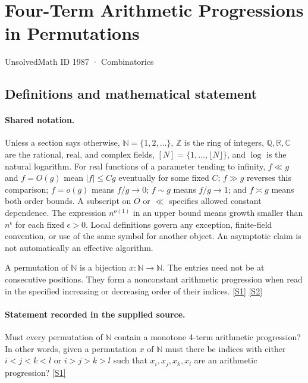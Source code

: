 \documentclass[11pt,a4paper]{article}
\newcommand{\N}{\mathbb{N}}
\newcommand{\Z}{\mathbb{Z}}
\newcommand{\Q}{\mathbb{Q}}
\newcommand{\R}{\mathbb{R}}
\newcommand{\C}{\mathbb{C}}
\newcommand{\sref}[2]{\hyperlink{source:#1:#2}{[S#2]}}
\begin{document}

\setcounter{section}{1986}

\section{Four-Term Arithmetic Progressions in Permutations}\label{1987}

{\small\sffamily UnsolvedMath ID 1987 · Combinatorics}

\subsection{Definitions and mathematical statement}

\paragraph{Shared notation.}Unless a section says otherwise, $\N=\{1,2,\ldots\}$,
$\Z$ is the ring of integers, $\Q,\R,\C$ are the rational, real, and complex
fields, $[N]=\{1,\ldots,\lfloor N\rfloor\}$, and $\log$ is the natural
logarithm. For real functions of a parameter tending to infinity,
$f\ll g$ and $f=O(g)$ mean $|f|\leq Cg$ eventually for some fixed $C$;
$f\gg g$ reverses this comparison; $f=o(g)$ means $f/g\to0$;
$f\sim g$ means $f/g\to1$; and $f\asymp g$ means both order bounds.
A subscript on $O$ or $\ll$ specifies allowed constant dependence.
The expression $n^{o(1)}$ in an upper bound means growth smaller than
$n^\epsilon$ for each fixed $\epsilon>0$. Local definitions govern any
exception, finite-field convention, or use of the same symbol for another
object. An asymptotic claim is not automatically an effective algorithm.



A permutation of $\N$ is a bijection $x:\N\to\N$. The entries need not be at consecutive positions. They form a nonconstant arithmetic progression when read in the specified increasing or decreasing order of their indices. \sref{1987}{1} \sref{1987}{2}

\paragraph{Statement recorded in the supplied source.}
Must every permutation of $\mathbb{N}$ contain a monotone 4-term arithmetic progression? In other words, given a permutation $x$ of $\mathbb{N}$ must there be indices with either $i<j<k<l$ or $i>j>k>l$ such that $x_i,x_j,x_k,x_l$ are an arithmetic progression? \sref{1987}{1}
\end{document}
